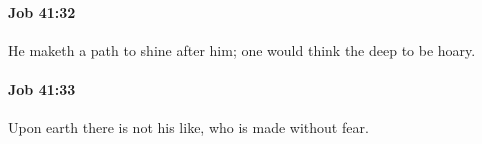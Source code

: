 		\paragraph{Job 41:32} %
			\label{JOB-41-32}

			He maketh a path to shine after him; one would think the deep to be hoary.


		\paragraph{Job 41:33} %
			\label{JOB-41-33}

			Upon earth there is not his like, who is made without fear.



